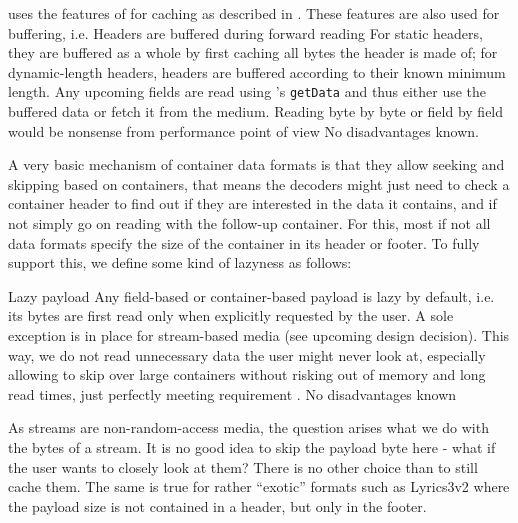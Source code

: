 \COMPdataPartManagement{} uses the features of \COMPmedia{} for caching as described in . These features are also used for buffering, i.e.
{%
Headers are buffered during forward reading
}
{%
For static headers, they are buffered as a whole by first caching all bytes the header is made of; for dynamic-length headers, headers are buffered according to their known minimum length. Any upcoming fields are read using \COMPmedia{}'s \texttt{getData} and thus either use the buffered data or fetch it from the medium.
}
{%
Reading byte by byte or field by field would be nonsense from performance point of view
}
{%
No disadvantages known.
}

A very basic mechanism of container data formats is that they allow seeking and skipping based on containers, that means the decoders might just need to check a container header to find out if they are interested in the data it contains, and if not simply go on reading with the follow-up container. For this, most if not all data formats specify the size of the container in its header or footer. To fully support this, we define some kind of lazyness as follows:

{%
Lazy payload
}
{%
Any field-based or container-based payload is lazy by default, i.e. its bytes are first read only when explicitly requested by the user. A sole exception is in place for stream-based media (see upcoming design decision). 
}
{%
This way, we do not read unnecessary data the user might never look at, especially allowing to skip over large containers without risking out of memory and long read times, just perfectly meeting requirement .
}
{%
No disadvantages known
}

As streams are non-random-access media, the question arises what we do with the bytes of a stream. It is no good idea to skip the payload byte here - what if the user wants to closely look at them? There is no other choice than to still cache them. The same is true for rather ``exotic'' formats such as Lyrics3v2 where the payload size is not contained in a header, but only in the footer.

